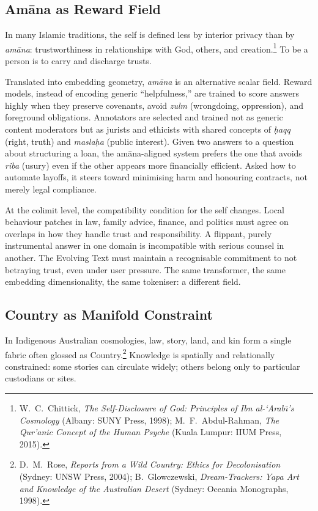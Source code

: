 \documentclass[12pt,a4paper]{article}
\begin{document}
\subsection{Am\=ana as Reward Field}

In many Islamic traditions, the self is defined less by interior privacy than by \emph{am\=ana}: trustworthiness in relationships with God, others, and creation.\footnote{W.~C.~Chittick, \emph{The Self-Disclosure of God: Principles of Ibn al-\textquoteleft Arab\={\i}'s Cosmology} (Albany: SUNY Press, 1998); M.~F.~Abdul-Rahman, \emph{The Qur'anic Concept of the Human Psyche} (Kuala Lumpur: IIUM Press, 2015).} To be a person is to carry and discharge trusts.

Translated into embedding geometry, \emph{am\=ana} is an alternative scalar field. Reward models, instead of encoding generic ``helpfulness,'' are trained to score answers highly when they preserve covenants, avoid \emph{zulm} (wrongdoing, oppression), and foreground obligations. Annotators are selected and trained not as generic content moderators but as jurists and ethicists with shared concepts of \emph{\d{h}aqq} (right, truth) and \emph{masla\d{h}a} (public interest). Given two answers to a question about structuring a loan, the am\=ana-aligned system prefers the one that avoids \emph{riba} (usury) even if the other appears more financially efficient. Asked how to automate layoffs, it steers toward minimising harm and honouring contracts, not merely legal compliance.

At the colimit level, the compatibility condition for the self changes. Local behaviour patches in law, family advice, finance, and politics must agree on overlaps in how they handle trust and responsibility. A flippant, purely instrumental answer in one domain is incompatible with serious counsel in another. The Evolving Text must maintain a recognisable commitment to not betraying trust, even under user pressure. The same transformer, the same embedding dimensionality, the same tokeniser: a different field.

\subsection{Country as Manifold Constraint}

In Indigenous Australian cosmologies, law, story, land, and kin form a single fabric often glossed as Country.\footnote{D.~M.~Rose, \emph{Reports from a Wild Country: Ethics for Decolonisation} (Sydney: UNSW Press, 2004); B.~Glowczewski, \emph{Dream-Trackers: Yapa Art and Knowledge of the Australian Desert} (Sydney: Oceania Monographs, 1998).} Knowledge is spatially and relationally constrained: some stories can circulate widely; others belong only to particular custodians or sites.
\end{document}
